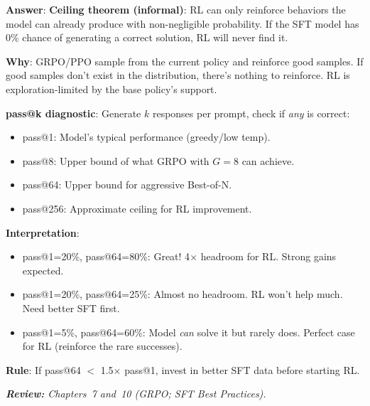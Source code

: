 \begin{questionbox}
\textbf{Answer}: \textbf{Ceiling theorem (informal)}: RL can only reinforce behaviors the model can already produce with non-negligible probability. If the SFT model has 0\% chance of generating a correct solution, RL will never find it.

\textbf{Why}: GRPO/PPO sample from the current policy and reinforce good samples. If good samples don’t exist in the distribution, there’s nothing to reinforce. RL is exploration-limited by the base policy’s support.

\textbf{pass@k diagnostic}: Generate $k$ responses per prompt, check if \emph{any} is correct:

\begin{itemize}
  \item pass@1: Model’s typical performance (greedy/low temp).
  \item pass@8: Upper bound of what GRPO with $G=8$ can achieve.
  \item pass@64: Upper bound for aggressive Best-of-N.
  \item pass@256: Approximate ceiling for RL improvement.
\end{itemize}

\textbf{Interpretation}:

\begin{itemize}
  \item pass@1=20\%, pass@64=80\%: Great! 4$\times$ headroom for RL. Strong gains expected.
  \item pass@1=20\%, pass@64=25\%: Almost no headroom. RL won’t help much. Need better SFT first.
  \item pass@1=5\%, pass@64=60\%: Model \emph{can} solve it but rarely does. Perfect case for RL (reinforce the rare successes).
\end{itemize}

\textbf{Rule}: If pass@64 $<$ 1.5$\times$ pass@1, invest in better SFT data before starting RL.

\emph{\textbf{Review:} Chapters~7 and~10 (GRPO; SFT Best Practices).}
\end{questionbox}

